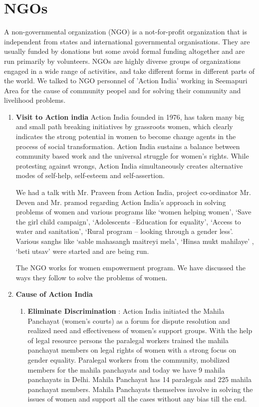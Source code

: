 \section{NGOs}
A non-governmental organization (NGO) is a not-for-profit organization that is independent from states and international governmental organisations. They are usually funded by donations but some avoid formal funding altogether and are run primarily by volunteers. NGOs are highly diverse groups of organizations engaged in a wide range of activities, and take different forms in different parts of the world. We talked to NGO personnel of 'Action India' working in Seemapuri Area for the cause of community peopel and for solving their  community and livelihood problems. 
\begin{enumerate}
\item \textbf {Visit to Action india}
Action India founded in 1976, has taken many big and small path breaking initiatives by grassroots women, which clearly indicates the strong potential in women to become change agents in the process of social transformation. Action India sustains a balance between community based work and the universal struggle for women’s rights. While protesting against wrongs, Action India simultaneously creates alternative modes of self-help, self-esteem and self-assertion.

We had a talk with Mr. Praveen from Action India, project co-ordinator Mr. Deven
and Mr. pramod regarding Action India’s approach in solving problems of women
and various programs like ‘women helping women’, ‘Save the girl child campaign’,
‘Adolescents –Education for equality’, ‘Access to water and sanitation’, ‘Rural
program – looking through a gender less’. Various sanghs like ‘sable mahasangh
maitreyi mela’, ‘Hinsa mukt mahilaye’ , ‘beti utsav’ were started and are being run.

The NGO works for women empowerment program. We have discussed the ways
they follow to solve the problems of women.



 \item \textbf{Cause of Action India}
\begin{enumerate} 
 \item   \textbf{Eliminate Discrimination} : Action India initiated the Mahila Panchayat (women’s courts) as a forum for
dispute resolution and realized need and effectiveness of women’s support groups. With the help of legal resource persons the paralegal workers trained the mahila panchayat members on legal rights of women with a strong focus on gender equality. Paralegal workers from the community, mobilized members for the mahila panchayats and today we have 9 mahila panchayats in Delhi. Mahila Panchayat has 14 paralegals and 225 mahila panchayat members. Mahila Panchayats themselves involve in solving the issues of women and support all the cases without any bias till the end.


\end{enumerate}
\end{enumerate}
